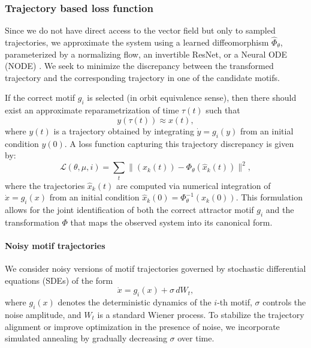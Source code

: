 \documentclass{article}
\theoremstyle{definition} \newtheorem{definition}{Definition}  \newtheorem{example}{Example}
\theoremstyle{remark} \newtheorem{remark}{Remark}
\newcommand{\reals}{\mathbb{R}}
\newcounter{ct}
\begin{document}
\subsubsection{Trajectory based loss function}
Since we do not have direct access to the vector field but only to sampled trajectories, we approximate the system using a learned diffeomorphism \( \hat{\Phi}_\theta \), parameterized by a normalizing flow\citep{kobyzev2020normalizing,papamakarios2021normalizing}, an invertible ResNet\citep{he2016deep}, or a Neural ODE (NODE) \citep{chen2018neural}.
 We seek to minimize the discrepancy between the transformed trajectory and the corresponding trajectory in one of the candidate motifs.

 If the correct motif \( g_i \) is selected (in orbit equivalence sense), then there should exist an approximate reparametrization of time \( \tau(t) \) such that
\[
y(\tau(t)) \approx x(t),
\]
where \( y(t) \) is a trajectory obtained by integrating \( \dot{y} = g_i(y) \) from an initial condition \( y(0) \). 
A loss function capturing this trajectory discrepancy is given by:
\[
\mathcal{L}(\theta, \mu, i) = \sum_{t} \Big\| (x_k(t)) - \Phi_\theta(\hat{x}_k(t)) \Big\|^2,
\]
where the trajectories \( \hat{x}_k(t) \) are computed via numerical integration of \(\dot x =  g_i(x) \) from an initial condition $\hat x_k(0) = \Phi_\theta^{-1}(x_k(0))$. %
This formulation allows for the joint identification of both the correct attractor motif \( g_i \) and the transformation \( \Phi \) that maps the observed system into its canonical form.


\paragraph{Noisy motif trajectories}
We consider noisy versions of motif trajectories governed by stochastic differential equations (SDEs) of the form
\begin{equation}
\dot x = g_i(x) + \sigma \, dW_t,
\end{equation}
where \( g_i(x) \) denotes the deterministic dynamics of the \( i \)-th motif, \( \sigma \) controls the noise amplitude, and \( W_t \) is a standard Wiener process.
To stabilize the trajectory alignment or improve optimization in the presence of noise, we incorporate simulated annealing by gradually decreasing \( \sigma \) over time.
\end{document}

